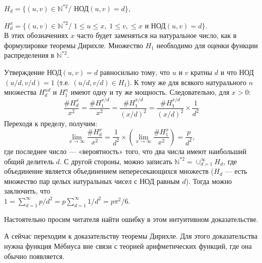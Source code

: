 \hspace*{1cm}$H_{d}=\{(u,v)\in\mathbb{N}^{*2}/$ НОД$(u,v)=d\}$,

\hspace*{1cm}$H_{d}^x=\{(u,v)\in\mathbb{N}^{*2}/\;1\leqslant u\leqslant x,\;1\leqslant v, \leqslant x$ и НОД$(u,v)=d\}.$
\\

\noindent В этих обозначениях $x$ часто будет заменяться на натуральное число,
как в формулировке теоремы Дирихле. Множество $H_{1}$ необходимо для
оценки функции распределения в $\mathbb{N}^{*2}$.

\begin{myproof}
Утверждение НОД$(u,v) = d$ равносильно тому, что $u$ и $v$ кратны
$d$ и что НОД$(u/d,v/d) = 1$ (т.е. $(u/d,v/d)\in H_{1}$). К тому же для
всякого натурального $n$ множества $H_{d}^{nd}$ и  $H_{1}^n$ имеют одну и ту же
мощность. Следовательно, для $x > 0$:
$$\frac{\#H_{d}^x}{x^2}=\frac{\#H_{1}^{x/d}}{x^2}=\frac{\#H_{1}^{x/d}}{(x/d)^2}=\frac{\#H_{1}^{x/d}}{(x/d)^2}\times\frac{1}{d^2}$$
Переходя к пределу, получим:
$$\lim\limits_{x\to\infty}\frac{\#H_{d}^x}{x^2}=\frac{1}{d^2}\times\left(\lim\limits_{x\to\infty}\frac{\#H_{1}^x}{x^2} \right) = \frac{p}{d^2},$$
где последнее число — «вероятность» того, что два числа имеют
наибольший общий делитель $d$. С другой стороны, можно запи­сать $\mathbb{N}^{*2}=\cup_{d=1}^{\infty}H_{d}$, где
 объединение является объединением непересекающихся множеств ($H_{d}$ — есть множество пар целых натуральных чисел с НОД равным $d$). Тогда можно заключить, что\\
$1 =\sum\nolimits_{d=1}^{\infty} p/d^2 = p\sum\nolimits_{d=1}^{\infty}1/d^2=p\pi^2/6$.
\end{myproof}

Настоятельно просим читателя найти ошибку в этом интуитивном
доказательстве.

А сейчас переходим к доказательству теоремы Дирихле. Для этого
доказательства нужна функция Мёбиуса вне связи с теорией арифме­тических функций, где она обычно появляется.


